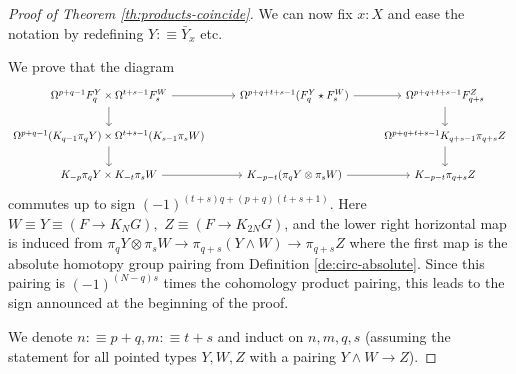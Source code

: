 \documentclass{amsart}
\theoremstyle{definition}
\newcommand{\join}{\star}
\begin{document}
\begin{proof}[Proof of Theorem \ref{th:products-coincide}]
    We can now fix $x:X$ and ease the notation by redefining $Y :\equiv \bar{Y}_x$ etc.

    We prove that the diagram
    \[
    \begin{tikzcd}
    	{\Omega^{p+q-1} F^Y_q \times \Omega^{t+s-1} F^W_s} & {\Omega^{p+q+t+s-1} (F_q^Y \join F^W_s)} & {\Omega^{p+q+t+s-1} F^Z_{q+s}} \\
    	{\Omega^{p+q-1}(K_{q-1}\pi_q Y) \times \Omega^{{t+s-1}}(K_{s-1}\pi_s W)} && {\Omega^{p+q+t+s-1}K_{q+s-1}\pi_{q+s} Z} \\
    	{K_{-p} \pi_q Y \times K_{-t} \pi_s W} & {K_{-p-t} (\pi_q Y \otimes \pi_s W)} & {K_{-p-t}\pi_{q+s} Z}
    	\arrow[from=1-1, to=1-2]
    	\arrow[from=1-1, to=2-1]
    	\arrow[from=1-2, to=1-3]
    	\arrow[from=1-3, to=2-3]
    	\arrow[from=2-1, to=3-1]
    	\arrow[from=2-3, to=3-3]
    	\arrow[from=3-1, to=3-2]
    	\arrow[from=3-2, to=3-3]
    \end{tikzcd}
    \]
    commutes up to sign $(-1)^{(t+s)q+(p+q)(t+s+1)}$. Here $W \equiv Y \equiv (F \to K_NG),$ $Z \equiv (F  \to K_{2N}G)$, and the lower right horizontal map is induced from $\pi_q Y \otimes \pi_s W  \to \pi_{q+s}(Y \wedge W)\to \pi_{q+s}Z$ where the first map is the absolute homotopy group pairing from Definition \ref{de:circ-absolute}. Since this pairing is
    $(-1)^{(N-q)s}$
    times the cohomology product pairing, this leads to the sign announced at the beginning of the proof.

    We denote $n:\equiv p+q, m: \equiv t+s$ and induct on $n, m, q, s$ (assuming the statement for all pointed types $Y, W, Z$ with a pairing $Y \wedge W \to Z$).


\end{proof}
\end{document}
